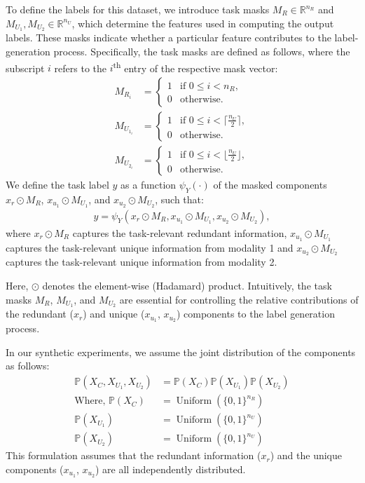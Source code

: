 To define the labels for this dataset, we introduce task masks \(M_{R} \in \mathbb{R}^{n_R}\) and \(M_{U_1}, M_{U_2} \in \mathbb{R}^{n_U}\), which determine the features used in computing the output labels. These masks indicate whether a particular feature contributes to the label-generation process. Specifically, the task masks are defined as follows, where the subscript \(i\) refers to the \(i\)\textsuperscript{th} entry of the respective mask vector:
\begin{align}
    M_{R_i} &=
        \begin{cases} 
        1 & \text{if } 0 \leq i < n_R, \\
        0 & \text{otherwise.}
        \end{cases} \\
    M_{U_{1_i}} & = \begin{cases} 
        1 & \text{if } 0 \leq i < \lceil \frac{n_{U}}{2} \rceil, \\
        0 & \text{otherwise.}
        \end{cases} \\
    M_{U_{2_i}} & = \begin{cases} 
        1 & \text{if } 0 \leq i <  \lfloor \frac{n_{U}}{2} \rfloor, \\
        0 & \text{otherwise.}
        \end{cases} 
\end{align}
We define the task label \(y\) as a function \(\psi_{Y}(\cdot)\) of the masked components \(x_r \odot M_R\), \(x_{u_1} \odot M_{U_1}\), and \(x_{u_2} \odot M_{U_2}\), such that:
\begin{align}
    y = \psi_{Y}(x_r \odot M_R, x_{u_1} \odot M_{U_1}, x_{u_2} \odot M_{U_2}), 
\end{align}
where \(x_r \odot M_R\) captures the task-relevant redundant information, \(x_{u_1} \odot M_{U_1}\) captures the task-relevant unique information from modality 1 and \(x_{u_2} \odot M_{U_2}\) captures the task-relevant unique information from modality 2.
 
 
Here, \(\odot\) denotes the element-wise (Hadamard) product. Intuitively, the task masks \(M_R\), \(M_{U_1}\), and \(M_{U_2}\) are essential for controlling the relative contributions of the redundant (\(x_r\)) and unique (\(x_{u_1}\), \(x_{u_2}\)) components to the label generation process.

In our synthetic experiments, we assume the joint distribution of the components as follows:
\begin{align}
    \mathbb{P}(X_C, X_{U_1}, X_{U_2}) &= \mathbb{P}(X_C)\mathbb{P}(X_{U_1})\mathbb{P}(X_{U_2}) \\
    \text{Where, }\mathbb{P}(X_C) &= \operatorname{Uniform}(\{0, 1\}^{n_R}) \\
    \mathbb{P}(X_{U_1}) &= \operatorname{Uniform}(\{0, 1\}^{n_U}) \\
    \mathbb{P}(X_{U_2}) &= \operatorname{Uniform}(\{0, 1\}^{n_U})
\end{align}
This formulation assumes that the redundant information (\(x_r\)) and the unique components (\(x_{u_1}\), \(x_{u_2}\)) are all independently distributed. 

